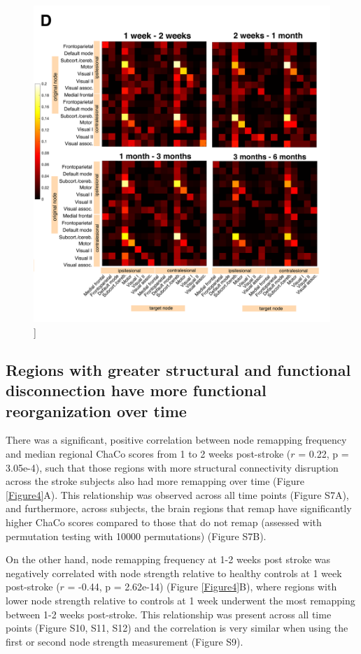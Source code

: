 \documentclass[phd,tocprelim]{cornell}
\renewcommand{\caption}[1]{\singlespacing\hangcaption{#1}\normalspacing}
\begin{document}
\null
\vfill
\clearpage
\null
\vfill
\begin{figure}[h!]
		\ContinuedFloat
		\captionsetup{labelformat=adja-page}
    \centering
    \includegraphics[width=\textwidth]{chapter1/Figure3D.png}
    \caption[]{}
\end{figure}
\null
\vfill
\clearpage

	\subsection{Regions with greater structural and functional disconnection  have more functional reorganization over time}
	There was a significant, positive correlation between node remapping frequency and median regional ChaCo scores from 1 to 2 weeks post-stroke ($r$ = 0.22, p = 3.05e-4), such that those regions with more structural connectivity disruption across the stroke subjects also had more remapping over time (Figure \ref{Figure4}A). This relationship was observed across all time points (Figure S7A), and furthermore, across subjects, the brain regions that remap have significantly higher ChaCo scores compared to those that do not remap (assessed with permutation testing with 10000 permutations) (Figure S7B).
	
	On the other hand, node remapping frequency at 1-2 weeks post stroke was negatively correlated with node strength relative to healthy controls at 1 week post-stroke ($r$  = -0.44, p = 2.62e-14) (Figure \ref{Figure4}B), where regions with lower node strength relative to controls at 1 week underwent the most remapping between 1-2 weeks post-stroke. This relationship was present across all time points (Figure S10, S11, S12) and the correlation is very similar when using the first or second node strength measurement (Figure S9).
	
\end{document}
